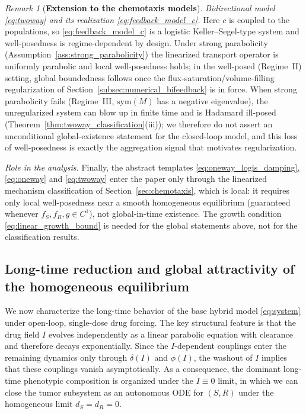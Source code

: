 \documentclass[pdflatex,sn-mathphys-ay]{sn-jnl}
\theoremstyle{thmstyleone}
\theoremstyle{definition}
\theoremstyle{remark}
\newtheorem{remark}[theorem]{Remark}
\begin{document}
\begin{remark}[\textbf{Extension to the chemotaxis models}]
\emph{Bidirectional model \eqref{eq:twoway} and its realization
\eqref{eq:feedback_model_c}.} Here $c$ is coupled to the populations, so
\eqref{eq:feedback_model_c} is a logistic Keller--Segel-type system and
well-posedness is regime-dependent by design. Under strong parabolicity
(Assumption~\ref{ass:strong_parabolicity}) the linearized transport operator is
uniformly parabolic and local well-posedness holds; in the well-posed (Regime~II)
setting, global boundedness follows once the flux-saturation/volume-filling
regularization of Section~\ref{subsec:numerical_bifeedback} is in force. When
strong parabolicity fails (Regime~III, $\mathrm{sym}(M)$ has a negative
eigenvalue), the unregularized system can blow up in finite time and is
Hadamard ill-posed (Theorem~\ref{thm:twoway_classification}(iii)); we therefore do
not assert an unconditional global-existence statement for the closed-loop model,
and this loss of well-posedness is exactly the aggregation signal that motivates
regularization.

\emph{Role in the analysis.} Finally, the abstract templates
\eqref{eq:oneway_logis_damping}, \eqref{eq:oneway} and \eqref{eq:twoway} enter the paper only through
the linearized mechanism classification of
Section~\ref{sec:chemotaxis}, which is local: it requires only local
well-posedness near a smooth homogeneous equilibrium (guaranteed whenever
$f_S,f_R,g\in C^1$), not global-in-time existence. The growth condition
\eqref{eq:linear_growth_bound} is needed for the global statements above, not for
the classification results.
\end{remark}

\subsection{Long-time reduction and global attractivity of the homogeneous equilibrium}
\label{subsec:long_time_reduction}

We now characterize the long-time behavior of the base hybrid model \eqref{eq:system} under open-loop, single-dose drug forcing. 
The key structural feature is that the drug field $I$ evolves independently as a linear parabolic equation with clearance and therefore decays exponentially. 
Since the $I$-dependent couplings enter the remaining dynamics only through $\delta(I)$ and $\phi(I)$, the washout of $I$ implies that these couplings vanish asymptotically. 
As a consequence, the dominant long-time phenotypic composition is organized under the $I\equiv 0$ limit, in which we can close the tumor subsystem as an autonomous ODE for $(S,R)$ under the homogeneous limit $d_S=d_R=0$.
\end{document}
